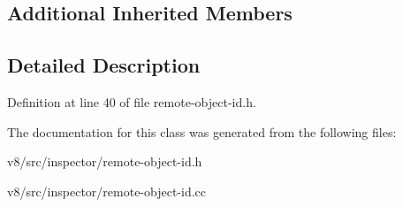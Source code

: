 \subsection*{Additional Inherited Members}


\subsection{Detailed Description}


Definition at line 40 of file remote-\/object-\/id.\+h.



The documentation for this class was generated from the following files\+:\begin{DoxyCompactItemize}
\item 
v8/src/inspector/remote-\/object-\/id.\+h\item 
v8/src/inspector/remote-\/object-\/id.\+cc\end{DoxyCompactItemize}

